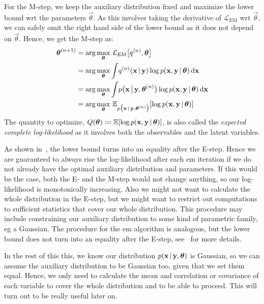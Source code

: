 		For the M-step, we keep the auxiliary distribution fixed and maximize the lower bound \ac{wrt} the parameters \(\vec{\theta}\). As this involves taking the derivative of \(\mathcal{L}_\mathrm{EM}\) \ac{wrt} \(\vec{\theta}\), we can safely omit the right hand side of the lower bound as it does not depend on \(\vec{\theta}\). Hence, we get the M-step as:
		\begin{align*}
			\boldsymbol{\mathrm{\theta}}^{(n + 1)}
				&= \arg\max_{\boldsymbol{\mathrm{\theta}}}\, \mathcal{L}_\mathrm{EM}\big[ q^{(n)}, \boldsymbol{\mathrm{\theta}} \big] \\
				&= \arg\max_{\boldsymbol{\mathrm{\theta}}} \int\! q^{(n)}(\boldsymbol{\mathrm{x}} \,\vert\, \boldsymbol{\mathrm{y}}) \log p(\boldsymbol{\mathrm{x}}, \boldsymbol{\mathrm{y}} \,\vert\, \boldsymbol{\mathrm{\theta}}) \dd{\boldsymbol{\mathrm{x}}} \\
				&= \arg\max_{\boldsymbol{\mathrm{\theta}}} \int\! p\big(\boldsymbol{\mathrm{x}} \,\big\vert\, \boldsymbol{\mathrm{y}}, \boldsymbol{\mathrm{\theta}}^{(n)}\big) \log p(\boldsymbol{\mathrm{x}}, \boldsymbol{\mathrm{y}} \,\vert\, \boldsymbol{\mathrm{\theta}}) \dd{\boldsymbol{\mathrm{x}}} \\
				&= \arg\max_{\boldsymbol{\mathrm{\theta}}}\, \mathbb{E}_{p\big(\boldsymbol{\mathrm{x}} \,\vert\, \boldsymbol{\mathrm{y}}, \boldsymbol{\mathrm{\theta}}^{(n)}\big)}[\log p(\boldsymbol{\mathrm{x}}, \boldsymbol{\mathrm{y}} \,\vert\, \boldsymbol{\mathrm{\theta}})]
		\end{align*}
		The quantity to optimize, \( Q(\boldsymbol{\mathrm{\theta}}) \coloneqq \mathbb{E}[\log p(\boldsymbol{\mathrm{x}}, \boldsymbol{\mathrm{y}} \,\vert\, \boldsymbol{\mathrm{\theta}})] \), is also called the \emph{expected complete log-likelihood} as it involves both the observables and the latent variables.

		As shown in~\cite{bealVariationalAlgorithmsApproximate2003}, the lower bound turns into an equality after the E-step. Hence we are guaranteed to always rise the log-likelihood after each \ac{em} iteration if we do not already have the optimal auxiliary distribution and parameters. If this would be the case, both the E- and the M-step would not change anything, so our log-likelihood is monotonically increasing. Also we might not want to calculate the whole distribution in the E-step, but we might want to restrict out computations to sufficient statistics that cover our whole distribution. This procedure may include constraining our auxiliary distribution to some kind of parametric family, \ac{eg} a Gaussian. The procedure for the \ac{em} algorithm is analogous, but the lower bound does not turn into an equality after the E-step, see~\cite[49-51]{bealVariationalAlgorithmsApproximate2003} for more details.

		In the rest of this this, we know our distribution \( p(\boldsymbol{\mathrm{x}} \,\vert\, \boldsymbol{\mathrm{y}}, \boldsymbol{\mathrm{\theta}}) \) is Gaussian, so we can assume the auxiliary distribution to be Gaussian too, given that we set them equal. Hence, we only need to calculate the mean and correlation or covariance of each variable to cover the whole distribution and to be able to proceed. This will turn out to be really useful later on.

